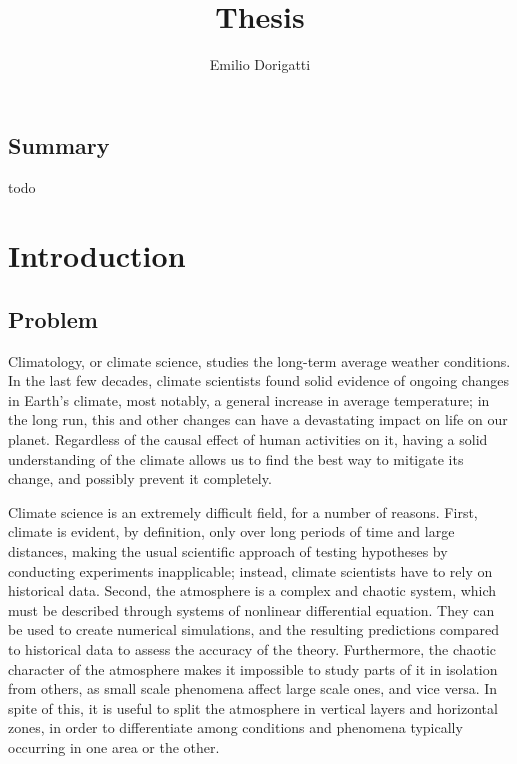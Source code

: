 \documentclass[12pt]{book}
\begin{document}
\title{Thesis}
\author{Emilio Dorigatti}

\maketitle

\section*{Summary}
todo

\tableofcontents

\chapter{Introduction}

\section{Problem}

Climatology, or climate science, studies the long-term average weather conditions. In the last few decades, climate scientists found solid evidence of ongoing changes in Earth's climate, most notably, a general increase in average temperature; in the long run, this and other changes can have a devastating impact on life on our planet. Regardless of the causal effect of human activities on it, having a solid understanding of the climate allows us to find the best way to mitigate its change, and possibly prevent it completely.

Climate science is an extremely difficult field, for a number of reasons. First, climate is evident, by definition, only over long periods of time and large distances, making the usual scientific approach of testing hypotheses by conducting experiments inapplicable; instead, climate scientists have to rely on historical data. Second, the atmosphere is a complex and chaotic system, which must be described through systems of nonlinear differential equation. They can be used to create numerical simulations, and the resulting predictions compared to historical data to assess the accuracy of the theory. Furthermore, the chaotic character of the atmosphere makes it impossible to study parts of it in isolation from others, as small scale phenomena affect large scale ones, and vice versa. In spite of this, it is useful to split the atmosphere in vertical layers and horizontal zones, in order to differentiate among conditions and phenomena typically occurring in one area or the other.
\end{document}
